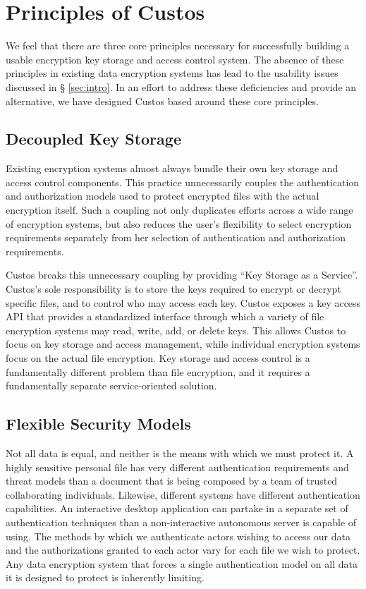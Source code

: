\section{Principles of Custos}
\label{sec:principles}

We feel that there are three core principles necessary for
successfully building a usable encryption key storage and access
control system. The absence of these principles in existing data
encryption systems has lead to the usability issues discussed in \S
\ref{sec:intro}. In an effort to address these deficiencies and
provide an alternative, we have designed Custos based around these
core principles.

\subsection{Decoupled Key Storage}

Existing encryption systems almost always bundle their own key storage
and access control components. This practice unnecessarily couples the
authentication and authorization models used to protect encrypted
files with the actual encryption itself. Such a coupling not only
duplicates efforts across a wide range of encryption systems, but also
reduces the user's flexibility to select encryption requirements
separately from her selection of authentication and authorization
requirements.

Custos breaks this unnecessary coupling by providing ``Key Storage as
a Service''. Custos's sole responsibility is to store the keys
required to encrypt or decrypt specific files, and to control who may
access each key. Custos exposes a key access API that provides a
standardized interface through which a variety of file encryption
systems may read, write, add, or delete keys. This allows Custos to
focus on key storage and access management, while individual
encryption systems focus on the actual file encryption. Key storage
and access control is a fundamentally different problem than file
encryption, and it requires a fundamentally separate service-oriented
solution.

\subsection{Flexible Security Models}

Not all data is equal, and neither is the means with which we must
protect it. A highly sensitive personal file has very different
authentication requirements and threat models than a document that is
being composed by a team of trusted collaborating
individuals. Likewise, different systems have different authentication
capabilities. An interactive desktop application can partake in a
separate set of authentication techniques than a non-interactive
autonomous server is capable of using. The methods by which we
authenticate actors wishing to access our data and the authorizations
granted to each actor vary for each file we wish to protect. Any data
encryption system that forces a single authentication model on all
data it is designed to protect is inherently limiting.

